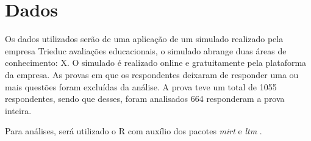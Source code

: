 \section{Dados}

Os dados utilizados serão de uma aplicação de um simulado realizado pela empresa Trieduc avaliações educacionais,  o simulado abrange duas áreas de conhecimento: X. O simulado é realizado online e gratuitamente pela plataforma da empresa.
As provas em que os respondentes deixaram de responder uma ou mais questões foram excluídas da análise. A prova teve um total de 1055 respondentes, sendo que desses, foram analisados 664 responderam a prova inteira.

Para análises, será utilizado o R \cite{r} com auxílio dos pacotes \textit{mirt} \cite{mirt} e \textit{ltm} \cite{ltm}.



